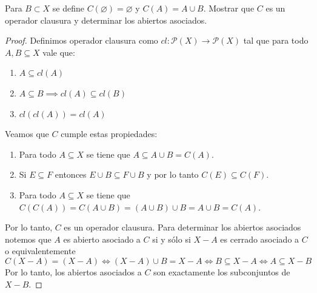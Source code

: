 \documentclass{article}
\theoremstyle{definition}
\newenvironment{ejercicio}[1]{\begin{trivlist}
\item[\hskip \labelsep {\bfseries Ejercicio}\hskip \labelsep {\bfseries #1.}]}{\end{trivlist}}
\begin{document}
\begin{ejercicio}{7}
    Para \(B \subset X\) se define \( C(\varnothing) = \varnothing \) y \( C(A) = A \cup B\). Mostrar que \( C \) es un operador clausura y determinar los abiertos asociados.
\end{ejercicio}
\begin{proof}
    Definimos operador clausura como \( cl : \mathcal{P}(X) \to \mathcal{P}(X) \) tal que para todo \( A, B \subseteq X \) vale que:
    \begin{enumerate}
        \item \( A \subseteq cl(A) \)
        \item \( A \subseteq B \implies cl(A) \subseteq cl(B) \)
        \item \( cl(cl(A)) = cl(A) \)
    \end{enumerate}
    Veamos que \( C \) cumple estas propiedades:
    \begin{enumerate}
        \item Para todo \( A \subseteq X \) se tiene que \( A \subseteq A \cup B = C(A) \).
        \item Si \( E \subseteq F \) entonces \( E \cup B \subseteq F \cup B \) y por lo tanto \( C(E) \subseteq C(F) \).
        \item Para todo \( A \subseteq X \) se tiene que \( C(C(A)) = C(A \cup B) = (A \cup B) \cup B = A \cup B = C(A) \).
    \end{enumerate}
    Por lo tanto, \( C \) es un operador clausura. Para determinar los abiertos asociados notemos que \( A \) es abierto asociado a \( C \) si y sólo si \( X - A \) es cerrado asociado a \( C \) o equivalentemente \[
        C(X - A) = (X - A) \iff (X - A) \cup B = X - A \iff B \subseteq X - A \iff A \subseteq X - B
    \]
    Por lo tanto, los abiertos asociados a \( C \) son exactamente los subconjuntos de \( X - B \).
\end{proof}
\end{document}
